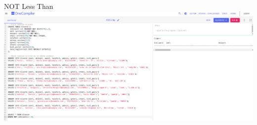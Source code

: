 \documentclass[
  ignorenonframetext,
]{beamer}
\begin{document}
\begin{frame}{NOT Less Than}
\label{not-less-than-2}
\includegraphics{./Figs/query29.png}
\end{frame}
\end{document}
